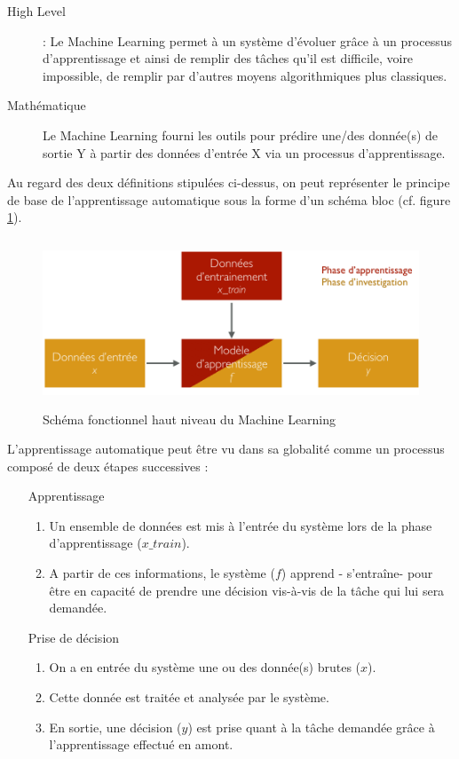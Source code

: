 \begin{description}
	\item[High Level]: Le Machine Learning permet à un système d'évoluer grâce à un processus d'apprentissage et ainsi de remplir des tâches qu'il est difficile, voire impossible, de remplir par d'autres moyens algorithmiques plus classiques. 
	\item[Mathématique] Le Machine Learning fourni les outils pour prédire une/des donnée(s) de sortie Y à partir des données d'entrée X via un processus d'apprentissage. 
\end{description}
 
Au regard des deux définitions stipulées ci-dessus, on peut représenter le principe de base de l'apprentissage automatique sous la forme d'un schéma bloc (cf. figure \ref{fig:Schéma fonctionnel haut niveau du Machine Learning}).

\begin{figure}[h]
	\centering\includegraphics[height=5cm]{images/ML_high_level.png}
	\caption{Schéma fonctionnel haut niveau du Machine Learning}
	\label{fig:Schéma fonctionnel haut niveau du Machine Learning}
\end{figure}

L'apprentissage automatique peut être vu dans sa globalité comme un processus composé de deux étapes successives : 
\begin{enumerate}
		\item [Apprentissage]
		 \begin{enumerate}
			\item  Un ensemble de données est mis à l'entrée du système lors de la phase d'apprentissage ($x\_train$).
			\item A partir de ces informations, le système ($f$) apprend - s'entraîne- pour être en capacité de prendre une décision vis-à-vis de la tâche qui lui sera demandée. 
		\end{enumerate}
		
		\item [Prise de décision] 
		\begin{enumerate}
			\item  On a en entrée du système une ou des donnée(s) brutes ($x$).  
			\item Cette donnée est traitée et analysée par le système.
			\item En sortie, une décision ($y$) est prise quant à la tâche demandée grâce à l'apprentissage effectué en amont. 
		\end{enumerate}
\end{enumerate}


